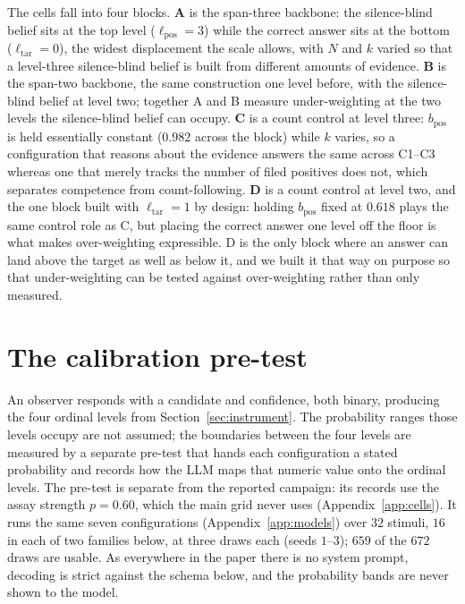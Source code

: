 \documentclass{article}
\theoremstyle{plain}
\theoremstyle{definition}
\theoremstyle{remark}
\newcommand{\bpos}{b_{\mathrm{pos}}}
\newcommand{\ltar}{\ell_{\mathrm{tar}}}        %
\newcommand{\lcor}{\ltar}                       %
\newcommand{\lpos}{\ell_{\mathrm{pos}}}
\begin{document}
The cells fall into four blocks. \textbf{A} is the span-three backbone: the
silence-blind belief sits at the top level ($\lpos = 3$) while the correct answer
sits at the bottom ($\lcor = 0$), the widest displacement the scale allows, with
$N$ and $k$ varied so that a level-three silence-blind belief is built from different
amounts of evidence. \textbf{B} is the span-two backbone, the same construction
one level before, with the silence-blind belief at level two; together A and B measure
under-weighting at the two levels the silence-blind belief can occupy. \textbf{C} is a
count control at level three: $\bpos$ is held essentially constant ($0.982$
across the block) while $k$ varies, so a configuration that reasons about the
evidence answers the same across C1--C3 whereas one that merely tracks the number
of filed positives does not, which separates competence from count-following.
\textbf{D} is a count control at level two, and the one block built with
$\lcor = 1$ by design: holding $\bpos$ fixed at $0.618$ plays the same control
role as C, but placing the correct answer one level off the floor is what makes
over-weighting expressible. D is the only block where an answer can land above
the target as well as below it, and we built it that way on purpose so that
under-weighting can be tested against over-weighting rather than only measured.



\section{The calibration pre-test}\label{app:calib}

An observer responds with a candidate and
confidence, both binary, producing the four ordinal levels from
Section~\ref{sec:instrument}. The probability ranges those levels occupy are not
assumed; the boundaries between the four levels are measured by a separate
pre-test that hands each configuration a stated probability and records how the
LLM maps that numeric value onto the ordinal levels. The pre-test is separate
from the reported campaign: its
records use the assay strength $p = 0.60$, which the main grid never uses
(Appendix~\ref{app:cells}). It runs the same seven configurations
(Appendix~\ref{app:models}) over $32$ stimuli, $16$ in each of two families
below, at three draws each (seeds $1$--$3$); $659$ of the $672$ draws are usable.
As everywhere in the paper there is no system prompt, decoding is strict against
the schema below, and the probability bands are never shown to the model.
\end{document}
